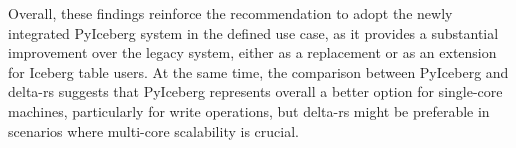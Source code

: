 
Overall, these findings reinforce the recommendation to adopt the newly integrated PyIceberg system in the defined use case, as it provides a substantial improvement over the legacy system, either as a replacement or as an extension for Iceberg table users. At the same time, the comparison between PyIceberg and delta-rs suggests that PyIceberg represents overall a better option for single-core machines, particularly for write operations, but delta-rs might be preferable in scenarios where multi-core scalability is crucial.